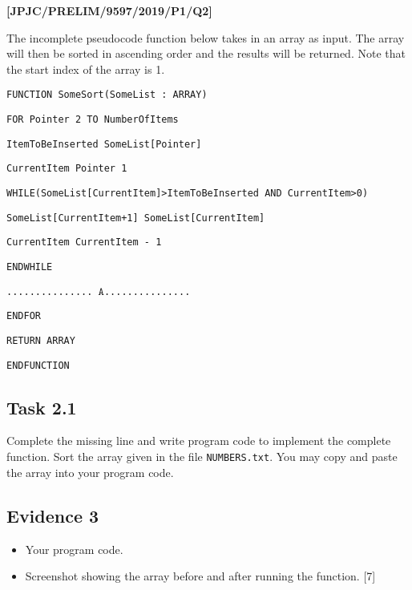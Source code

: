 \item \textbf{{[}JPJC/PRELIM/9597/2019/P1/Q2{]} }

The incomplete pseudocode function below takes in an array as input.
The array will then be sorted in ascending order and the results will
be returned. Note that the start index of the array is 1. 

\noindent %
\noindent\begin{minipage}[t]{1\columnwidth}%
\texttt{FUNCTION SomeSort(SomeList : ARRAY) }

\texttt{\qquad{}FOR Pointer \textleftarrow{} 2 TO NumberOfItems }

\texttt{\qquad{}\qquad{}ItemToBeInserted \textleftarrow{} SomeList{[}Pointer{]} }

\texttt{\qquad{}\qquad{}CurrentItem \textleftarrow{} Pointer \textendash{}
1 }

\texttt{\qquad{}\qquad{}WHILE(SomeList{[}CurrentItem{]}>ItemToBeInserted
AND CurrentItem>0) }

\texttt{\qquad{}\qquad{}\qquad{}SomeList{[}CurrentItem+1{]} \textleftarrow{}
SomeList{[}CurrentItem{]} }

\texttt{\qquad{}\qquad{}\qquad{}CurrentItem \textleftarrow{} CurrentItem
- 1 }

\texttt{\qquad{}\qquad{}ENDWHILE}

\texttt{\qquad{}\qquad{}............... $\mathtt{A}$............... }

\texttt{\qquad{}ENDFOR }

\texttt{\qquad{}RETURN ARRAY}

\texttt{ENDFUNCTION }%
\end{minipage}

\subsection*{Task 2.1 }

Complete the missing line and write program code to implement the
complete function. Sort the array given in the file \texttt{NUMBERS.txt}.
You may copy and paste the array into your program code. 

\subsection*{Evidence 3 }
\begin{itemize}
\item Your program code. 
\item Screenshot showing the array before and after running the function.\hfill{}
{[}7{]}
\end{itemize}

